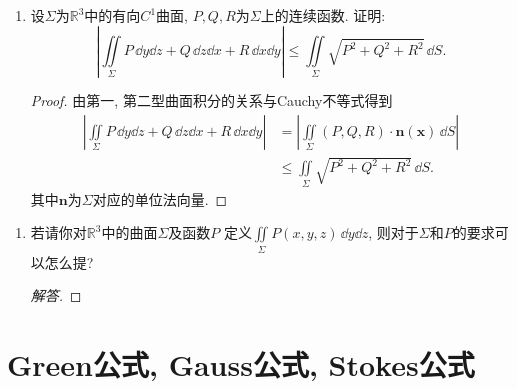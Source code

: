 \begin{quiza}
\begin{enumerate}
\item 设\(\varSigma\)为\(\mathbb{R}^3\)中的有向\(C^1\)曲面, 
\(P,Q,R\)为\(\varSigma\)上的连续函数. 证明:
\[\left|\iint\limits_{\varSigma}P\,\dd y\dd z+Q\,\dd z\dd x+R\,\dd x\dd y\right|
\leqslant\iint\limits_{\varSigma}\sqrt{P^2+Q^2+R^2}\,\dd S.\]
\begin{proof}
由第一, 第二型曲面积分的关系与Cauchy不等式得到
\begin{align*}\left|\iint\limits_{\varSigma}P\,\dd y\dd z+Q\,\dd z\dd x+R\,\dd x\dd y\right|
&=\left|\iint\limits_{\varSigma}\left(P,Q,R\right)\cdot\boldsymbol{n}(\boldsymbol{x})\,\dd S\right|\\
&\leqslant\iint\limits_{\varSigma}\sqrt{P^2+Q^2+R^2}\,\dd S.\end{align*}
其中\(\boldsymbol{n}\)为\(\varSigma\)对应的单位法向量.
\end{proof}
\end{enumerate}
\end{quiza}

\begin{quizb}
\begin{enumerate}
\item 若请你对\(\mathbb{R}^3\)中的曲面\(\varSigma\)及函数\(P\)
定义\(\iint\limits_{\varSigma}P(x,y,z)\,\dd y\dd z\), 
则对于\(\varSigma\)和\(P\)的要求可以怎么提? 
\begin{proof}[解答]

\end{proof}
\end{enumerate}
\end{quizb}

\section{Green公式, Gauss公式, Stokes公式}
